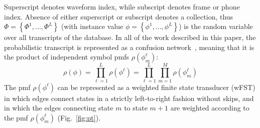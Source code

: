 Superscript denotes waveform index, while subscript denotes frame or
phone index.  Absence of either superscript or subscript denotes a
collection, thus $\Phi=\left\{\Phi^1,\ldots,\Phi^L\right\}$ (with
instance value $\phi=\left\{\phi^1,\ldots,\phi^L\right\}$) is the
random variable over all transcripts of the database.  In all of
the work described in this paper, the probabilistic transcript is
represented as a confusion network~\cite{Mangu00}, meaning that it is
the product of independent symbol pmfs $\rho(\phi_m^\ell)$:
\begin{equation}
  \rho(\phi)=\prod_{\ell=1}^L\rho(\phi^\ell)=
  \prod_{\ell=1}^L \prod_{m=1}^M \rho(\phi_m^{\ell})
\end{equation}
The pmf $\rho(\phi^\ell)$ can be represented as a weighted
finite state transducer (wFST) in which edges connect states in a
strictly left-to-right fashion without skips, and in which the edges
connecting state $m$ to state $m+1$ are weighted according to the pmf
$\rho(\phi_m^\ell)$ (Fig.~\ref{fig:pt}).
